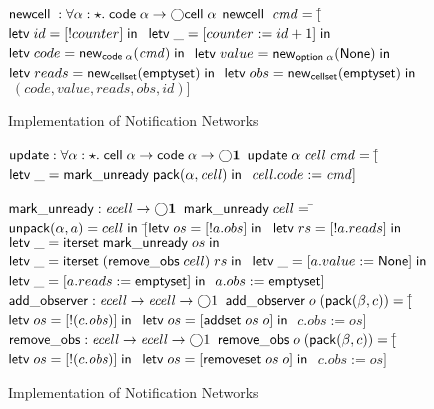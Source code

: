 \begin{figure}
\begin{specification}
$\mathsf{newcell}\; : \forall \alpha:\star.\; \mathsf{code}\;{\alpha} \to \bigcirc{\mathsf{cell}\;{\alpha}}$ \nextline
$\mathsf{newcell}\;\;\mathit{cmd} = [$\=$\mathsf{letv}\;id = [!counter]\;\mathsf{in}\;$ \nextline
                    \>$\mathsf{letv}\;\_ = [counter := id + 1]\;\mathsf{in}\;$ \nextline
                    \>$\mathsf{letv}\;code = \mathsf{new}_{\mathsf{code}\;{\alpha}}(\mathit{cmd})\;\mathsf{in}\;$ \nextline
                    \>$\mathsf{letv}\;value = \mathsf{new}_{\mathsf{option}{\;\alpha}}(\mathsf{None})\;\mathsf{in}\;$ \nextline
                    \>$\mathsf{letv}\;reads = \mathsf{new}_{\mathsf{cellset}}(\mathsf{emptyset})\;\mathsf{in}\;$ \nextline
                    \>$\mathsf{letv}\;obs = \mathsf{new}_{\mathsf{cellset}}(\mathsf{emptyset})\;\mathsf{in}\;$ \nextline
                    \>$\; (code, value, reads, obs, id)]$ 
\end{specification}
\caption{Implementation of Notification Networks}
\label{notification-implementation}
\end{figure}

\begin{figure}
\mbox{}
\begin{specification}
\nextline
$\mathsf{update} : \forall \alpha:\star.\; \mathsf{cell}\;{\alpha} \to \mathsf{code}\;{\alpha} \to \bigcirc{\mathbf{1}}$\nextline
$\mathsf{update}\;\alpha\;\mathit{cell}\;\mathit{cmd} = 
     [$\=$\mathsf{letv}\;\_ = \mathsf{mark\_unready}\;\mathsf{pack}({\alpha}, {\mathit{cell}})\;\mathsf{in}\;$ \nextline
       \>$\mathit{cell}.code := \mathit{cmd}]$ \nextline[1em]

$\mathsf{mark\_unready} : \mathit{ecell} \to \bigcirc{\mathbf{1}}$ \nextline
$\mathsf{mark\_unready}\;cell =\; $\=$\mathsf{unpack}(\alpha, a) = cell\; \mathsf{in}$\nextline
\>  $[$\=$\mathsf{letv}\;os = [!a.obs]\;\mathsf{in}\;$ \nextline
\>     \>$\mathsf{letv}\;rs = [!a.reads]\;\mathsf{in}\;$ \nextline
\>     \>$\mathsf{letv}\;\_ = \mathsf{iterset}\;\mathsf{mark\_unready}\;os\;\mathsf{in}\;$ \nextline
\>     \>$\mathsf{letv}\;\_ = \mathsf{iterset}\;(\mathsf{remove\_obs}\;cell)\;rs\;\mathsf{in}\;$ \nextline
\>     \>$\mathsf{letv}\;\_ = [a.value := \mathsf{None}]\;\mathsf{in}\;$ \nextline
\>     \>$\mathsf{letv}\;\_ = [a.reads := \mathsf{emptyset}]\;\mathsf{in}\;$ \nextline
\>     \>$a.obs   := \mathsf{emptyset}]$ 
\nextline[1em]
$\mathsf{add\_observer} : \mathit{ecell} \to \mathit{ecell} \to \bigcirc{1}$ \nextline
$\mathsf{add\_observer} \;o \;(\mathsf{pack}({\beta}, {c})) = [$\=$\mathsf{letv}\;os = [!(c.\mathit{obs})]\;\mathsf{in}\;$ \nextline
                                                  \>$\mathsf{letv}\;os = [\mathsf{addset}\;os\;o]\;\mathsf{in}\;$ \nextline
                                                  \>$c.\mathit{obs} := os]$
\nextline[1em]
$\mathsf{remove\_obs} : \mathit{ecell} \to \mathit{ecell} \to \bigcirc{1}$ \nextline
$\mathsf{remove\_obs} \;o \;(\mathsf{pack}({\beta}, {c})) = [$\=$\mathsf{letv}\;os = [!(c.\mathit{obs})]\;\mathsf{in}\;$ \nextline
                                             \>$\mathsf{letv}\;os = [\mathsf{removeset}\;os\;o]\;\mathsf{in}\;$ \nextline
                                             \>$c.\mathit{obs} := os]$

\end{specification}
\caption{Implementation of Notification Networks}
\label{notification-implementation-update}
\end{figure}

